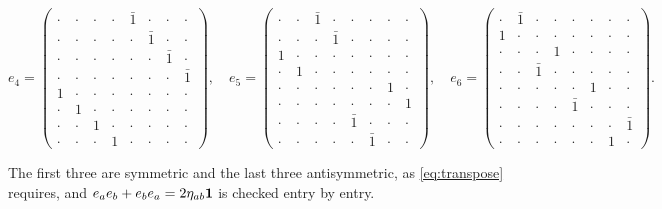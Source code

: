 \begin{center}
\[e_4=\begin{pmatrix}\cdot&\cdot&\cdot&\cdot&\bar1&\cdot&\cdot&\cdot\\\cdot&\cdot&\cdot&\cdot&\cdot&\bar1&\cdot&\cdot\\\cdot&\cdot&\cdot&\cdot&\cdot&\cdot&\bar1&\cdot\\\cdot&\cdot&\cdot&\cdot&\cdot&\cdot&\cdot&\bar1\\1&\cdot&\cdot&\cdot&\cdot&\cdot&\cdot&\cdot\\\cdot&1&\cdot&\cdot&\cdot&\cdot&\cdot&\cdot\\\cdot&\cdot&1&\cdot&\cdot&\cdot&\cdot&\cdot\\\cdot&\cdot&\cdot&1&\cdot&\cdot&\cdot&\cdot\end{pmatrix},\quad e_5=\begin{pmatrix}\cdot&\cdot&\bar1&\cdot&\cdot&\cdot&\cdot&\cdot\\\cdot&\cdot&\cdot&\bar1&\cdot&\cdot&\cdot&\cdot\\1&\cdot&\cdot&\cdot&\cdot&\cdot&\cdot&\cdot\\\cdot&1&\cdot&\cdot&\cdot&\cdot&\cdot&\cdot\\\cdot&\cdot&\cdot&\cdot&\cdot&\cdot&1&\cdot\\\cdot&\cdot&\cdot&\cdot&\cdot&\cdot&\cdot&1\\\cdot&\cdot&\cdot&\cdot&\bar1&\cdot&\cdot&\cdot\\\cdot&\cdot&\cdot&\cdot&\cdot&\bar1&\cdot&\cdot\end{pmatrix},\quad e_6=\begin{pmatrix}\cdot&\bar1&\cdot&\cdot&\cdot&\cdot&\cdot&\cdot\\1&\cdot&\cdot&\cdot&\cdot&\cdot&\cdot&\cdot\\\cdot&\cdot&\cdot&1&\cdot&\cdot&\cdot&\cdot\\\cdot&\cdot&\bar1&\cdot&\cdot&\cdot&\cdot&\cdot\\\cdot&\cdot&\cdot&\cdot&\cdot&1&\cdot&\cdot\\\cdot&\cdot&\cdot&\cdot&\bar1&\cdot&\cdot&\cdot\\\cdot&\cdot&\cdot&\cdot&\cdot&\cdot&\cdot&\bar1\\\cdot&\cdot&\cdot&\cdot&\cdot&\cdot&1&\cdot\end{pmatrix}.
\]
\end{center}
The first three are symmetric and the last three antisymmetric, as \eqref{eq:transpose} requires, and $e_ae_b+e_be_a=2\eta_{ab}\mathbf 1$ is checked entry by entry.

